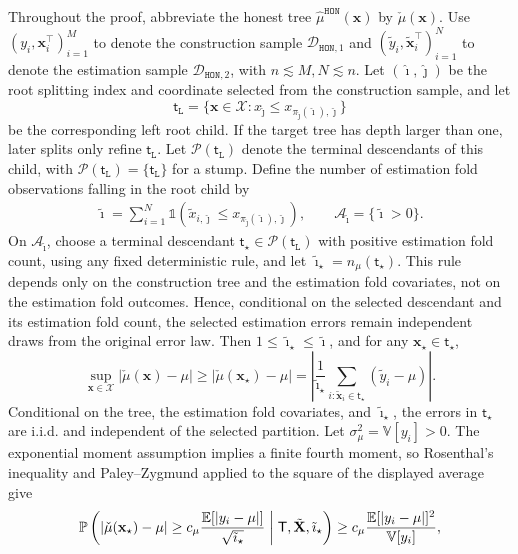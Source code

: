 \documentclass[10pt]{article}
\def\treeT{\mathsf{T}}
\def\nodet{\mathsf{t}}
\def\bx{\mathbf{x}}
\def\bX{\mathbf{X}}
\def\E{\mathbb{E}}
\def\P{\mathbb{P}}
\def\V{\mathbb{V}}
\def\dataD{\mathcal{D}}
\def\honest{\mathtt{HON}}
\newcommand{\Indicator}{\mathds{1}}
\theoremstyle{definition}
\theoremstyle{remark}
\begin{document}
Throughout the proof, abbreviate the honest tree $\hat{\mu}^{\honest}(\bx)$ by $\check{\mu}(\bx)$. Use $(y_i,\bx_i^{\top})_{i=1}^M$ to denote the construction sample $\dataD_{\honest,1}$ and $(\tilde{y}_i,\tilde{\bx}_i^{\top})_{i=1}^N$ to denote the estimation sample $\dataD_{\honest,2}$, with $n \lesssim M,N \lesssim n$. Let $(\hat{\imath},\hat{\jmath})$ be the root splitting index and coordinate selected from the construction sample, and let
\[
    \nodet_{\mathtt L}
    =
    \{\bx\in\mathcal X:x_{\hat{\jmath}}\leq x_{\pi_{\hat{\jmath}}(\hat{\imath}),\hat{\jmath}}\}
\]
be the corresponding left root child. If the target tree has depth larger than one, later splits only refine $\nodet_{\mathtt L}$. Let $\mathcal P(\nodet_{\mathtt L})$ denote the terminal descendants of this child, with $\mathcal P(\nodet_{\mathtt L})=\{\nodet_{\mathtt L}\}$ for a stump. Define the number of estimation fold observations falling in the root child by
\begin{align*}
    \tilde{\imath} = \sum_{i = 1}^N \Indicator(\tilde{x}_{i,\hat{\jmath}} \leq x_{\pi_{\hat{\jmath}}(\hat{\imath}), \hat{\jmath}}),
    \qquad
    \mathcal A_{\tilde{\imath}}=\{\tilde{\imath}>0\}.
\end{align*}
On $\mathcal A_{\tilde{\imath}}$, choose a terminal descendant $\nodet_\star\in\mathcal P(\nodet_{\mathtt L})$ with positive estimation fold count, using any fixed deterministic rule, and let $\tilde{\imath}_\star=n_\mu(\nodet_\star)$. This rule depends only on the construction tree and the estimation fold covariates, not on the estimation fold outcomes. Hence, conditional on the selected descendant and its estimation fold count, the selected estimation errors remain independent draws from the original error law. Then $1\leq \tilde{\imath}_\star\leq\tilde{\imath}$, and for any $\bx_\star\in\nodet_\star$,
\[
    \sup_{\bx\in\mathcal X}|\check{\mu}(\bx)-\mu|
    \geq
    |\check{\mu}(\bx_\star)-\mu|
    =
    \left|
    \frac{1}{\tilde{\imath}_\star}
    \sum_{i:\tilde{\bx}_i\in\nodet_\star}(\tilde y_i-\mu)
    \right|.
\]
Conditional on the tree, the estimation fold covariates, and $\tilde{\imath}_\star$, the errors in $\nodet_\star$ are i.i.d. and independent of the selected partition. Let $\sigma_\mu^2=\V[y_i]>0$. The exponential moment assumption implies a finite fourth moment, so Rosenthal's inequality and Paley--Zygmund applied to the square of the displayed average give
\[
    \P\left(
    |\check{\mu}(\bx_\star)-\mu|
    \geq
    c_\mu \frac{\E[|y_i-\mu|]}{\sqrt{\tilde{\imath}_\star}}
    \biggm|
    \treeT,\tilde{\bX},\tilde{\imath}_\star
    \right)
    \geq
    c_\mu \frac{\E[|y_i-\mu|]^2}{\V[y_i]},
\]
\end{document}
